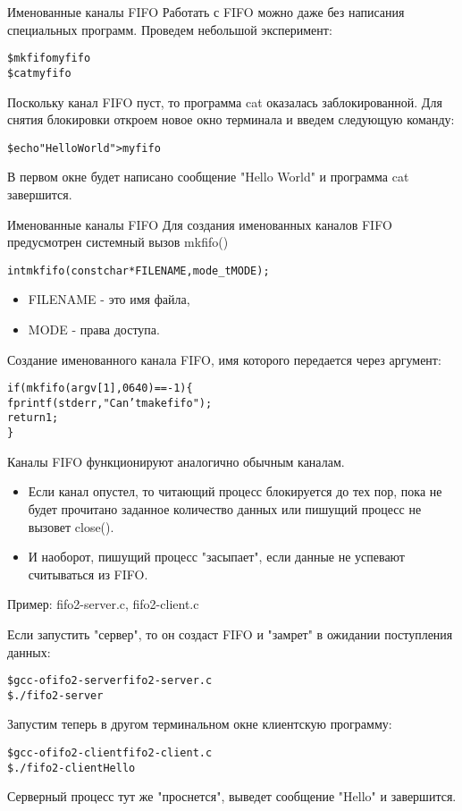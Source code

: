 \documentclass{beamer}
\begin{document}
\begin{frame}[fragile]{Именованные каналы FIFO}
Работать с FIFO можно даже без написания специальных программ. Проведем небольшой эксперимент:
\begin{alltt}
\$ mkfifo myfifo
\$ cat myfifo
\end{alltt}
Поскольку канал FIFO пуст, то программа cat оказалась заблокированной. Для снятия блокировки откроем новое окно терминала и введем следующую команду:
\begin{alltt}
\$ echo "Hello World" > myfifo
\end{alltt}
В первом окне будет написано сообщение "Hello World" и программа cat завершится.
\end{frame}

\begin{frame}[fragile]{Именованные каналы FIFO}
Для создания именованных каналов FIFO предусмотрен системный вызов mkfifo()
\begin{alltt}
int mkfifo (const char * FILENAME, mode_t MODE);
\end{alltt}
\begin{itemize}
\item FILENAME - это имя файла, 
\item MODE - права доступа. 
\end{itemize}

Создание именованного канала FIFO, имя которого передается через аргумент:
\begin{alltt}
if (mkfifo (argv[1], 0640) == -1) \{
  fprintf (stderr, "Can't make fifo");
  return 1;
\}
\end{alltt}
\end{frame}

\begin{frame}[fragile]
Каналы FIFO функционируют аналогично обычным каналам.
\begin{itemize}
\item Если канал опустел, то читающий процесс блокируется до тех пор, пока не будет прочитано заданное количество данных или пишущий процесс не вызовет close().
\item И наоборот, пишущий процесс "засыпает", если данные не успевают считываться из FIFO.
\end{itemize}
Пример: fifo2-server.c, fifo2-client.c 

Если запустить "сервер", то он создаст FIFO и "замрет" в ожидании поступления данных:
\begin{alltt}
\$ gcc -o fifo2-server fifo2-server.c
\$ ./fifo2-server
\end{alltt}
Запустим теперь в другом терминальном окне клиентскую программу:
\begin{alltt}
\$ gcc -o fifo2-client fifo2-client.c
\$ ./fifo2-client Hello
\end{alltt}
Серверный процесс тут же "проснется", выведет сообщение "Hello" и завершится.
\end{frame}

\end{document}
